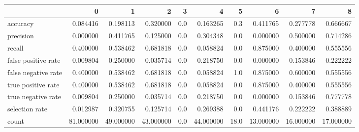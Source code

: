 \begin{tabular}{lrrrrrrrrr}
\toprule
{} &          0 &          1 &          2 &    3 &          4 &     5 &          6 &          7 &          8 \\
\midrule
accuracy            &   0.084416 &   0.198113 &   0.320000 &  0.0 &   0.163265 &   0.3 &   0.411765 &   0.277778 &   0.666667 \\
precision           &   0.000000 &   0.411765 &   0.125000 &  0.0 &   0.304348 &   0.0 &   0.000000 &   0.500000 &   0.714286 \\
recall              &   0.400000 &   0.538462 &   0.681818 &  0.0 &   0.058824 &   0.0 &   0.875000 &   0.400000 &   0.555556 \\
false positive rate &   0.009804 &   0.250000 &   0.035714 &  0.0 &   0.218750 &   0.0 &   0.000000 &   0.153846 &   0.222222 \\
false negative rate &   0.400000 &   0.538462 &   0.681818 &  0.0 &   0.058824 &   1.0 &   0.875000 &   0.600000 &   0.555556 \\
true positive rate  &   0.400000 &   0.538462 &   0.681818 &  0.0 &   0.058824 &   0.0 &   0.875000 &   0.400000 &   0.555556 \\
true negative rate  &   0.009804 &   0.250000 &   0.035714 &  0.0 &   0.218750 &   0.0 &   0.000000 &   0.153846 &   0.777778 \\
selection rate      &   0.012987 &   0.320755 &   0.125714 &  0.0 &   0.269388 &   0.0 &   0.441176 &   0.222222 &   0.388889 \\
count               &  81.000000 &  49.000000 &  43.000000 &  0.0 &  44.000000 &  18.0 &  13.000000 &  16.000000 &  17.000000 \\
\bottomrule
\end{tabular}
